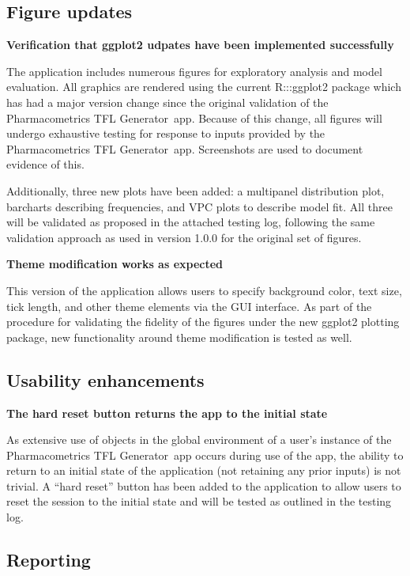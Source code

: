 \documentclass{article}
\newcommand{\tfl}{Pharmacometrics TFL Generator}
\begin{document}
\subsection*{Figure updates}

{\bf Verification that ggplot2 udpates have been implemented successfully}

The application includes numerous figures for exploratory analysis and model evaluation.  All graphics are rendered using the current R:::ggplot2 package which has had a major version change since the original validation of the \tfl\ app.  Because of this change, all figures will undergo exhaustive testing for response to inputs provided by the \tfl\ app. Screenshots are used to document evidence of this.

Additionally, three new plots have been added: a multipanel distribution plot, barcharts describing frequencies, and VPC plots to describe model fit.  All three will be validated as proposed in the attached testing log, following the same validation approach as used in version 1.0.0 for the original set of figures.

{\bf Theme modification works as expected}

This version of the application allows users to specify background color, text size, tick length, and other theme elements via the GUI interface.  As part of the procedure for validating the fidelity of the figures under the new ggplot2 plotting package, new functionality around theme modification is tested as well.  

\subsection*{Usability enhancements}

{\bf The hard reset button returns the app to the initial state}

As extensive use of objects in the global environment of a user's instance of the \tfl\ app occurs during use of the app, the ability to return to an initial state of the application (not retaining any prior inputs) is not trivial.  A ``hard reset'' button has been added to the application to allow users to reset the session to the initial state and will be tested as outlined in the testing log.

\subsection*{Reporting}
\end{document}
